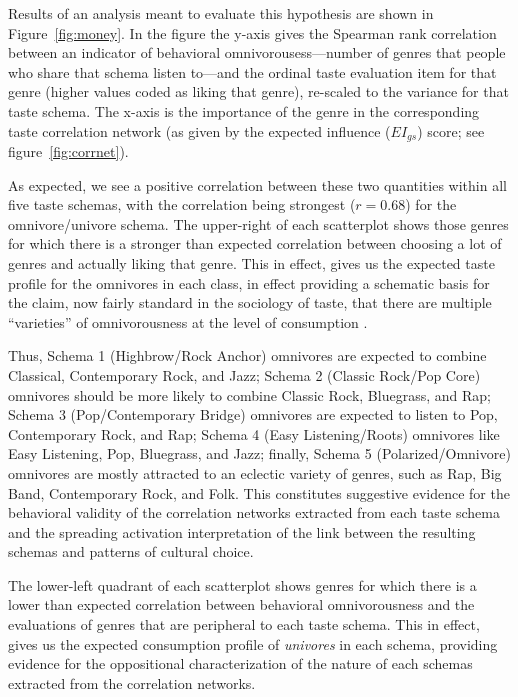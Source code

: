 \documentclass[preprint, authoryear,11pt, 3p]{elsarticle}
\begin{document}
Results of an analysis meant to evaluate this hypothesis are shown in Figure~\ref{fig:money}. In the figure the y-axis gives the Spearman rank correlation between an indicator of behavioral omnivorousess---number of genres that people who share that schema listen to---and the ordinal taste evaluation item for that genre (higher values coded as liking that genre), re-scaled to the variance for that taste schema. The x-axis is the importance of the genre in the corresponding taste correlation network (as given by the expected influence ($EI_{gs}$) score; see figure~\ref{fig:corrnet}). 

As expected, we see a positive correlation between these two quantities within all five taste schemas, with the correlation being strongest ($r = 0.68$) for the omnivore/univore schema. The upper-right of each scatterplot shows those genres for which there is a stronger than expected correlation between choosing a lot of genres and actually liking that genre. This in effect, gives us the expected taste profile for the omnivores in each class, in effect providing a schematic basis for the claim, now fairly standard in the sociology of taste, that there are multiple ``varieties'' of omnivorousness at the level of consumption \citep{coulangeon2015social, ollivier2008modes, savage2011unravelling}. 

Thus, Schema 1 (Highbrow/Rock Anchor) omnivores are expected to combine Classical, Contemporary Rock, and Jazz; Schema 2 (Classic Rock/Pop Core) omnivores should be more likely to combine Classic Rock, Bluegrass, and Rap; Schema 3 (Pop/Contemporary Bridge) omnivores are expected to listen to Pop, Contemporary Rock, and Rap; Schema 4 (Easy Listening/Roots) omnivores like Easy Listening, Pop, Bluegrass, and Jazz; finally, Schema 5 (Polarized/Omnivore) omnivores are mostly attracted to an eclectic variety of genres, such as Rap, Big Band, Contemporary Rock, and Folk. This constitutes suggestive evidence for the behavioral validity of the correlation networks extracted from each taste schema and the spreading activation interpretation of the link between the resulting schemas and patterns of cultural choice. 

The lower-left quadrant of each scatterplot shows genres for which there is a lower than expected correlation between behavioral omnivorousness and the evaluations of genres that are peripheral to each taste schema. This in effect, gives us the expected consumption profile of \emph{univores} in each schema, providing evidence for the oppositional characterization of the nature of each schemas extracted from the correlation networks. 
\end{document}

